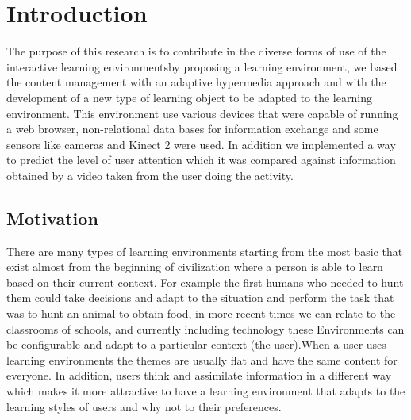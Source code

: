 \chapter{Introduction} \label{introduction} 

The purpose of this research is to contribute in the diverse forms of use of the interactive learning environmentsby proposing a learning environment, we based the content management with an adaptive hypermedia approach and 
with the development of a new type of learning object to be adapted to the learning environment.
This environment use various devices that were capable of running a web browser, non-relational data bases for information exchange and some sensors like cameras and Kinect 2 were used. In addition we implemented a way to predict the level of user attention
which it was compared against information obtained by a video taken from the user doing the activity.

\section{Motivation}
There are many types of learning environments starting from the most basic that exist almost from the beginning of civilization where a person is able to learn based on their current context.
For example the first humans who needed to hunt them could take decisions and adapt to the situation and perform the task that was to hunt an animal to obtain food, in more recent times we can relate to the classrooms of schools, and currently including technology these Environments can be configurable and adapt to a particular context (the user).When a user uses learning environments the themes are usually flat and have the same content for everyone. In addition, users think and assimilate information in a different way which makes it more attractive to have a learning environment that adapts to the learning styles of users and why not to their preferences.

